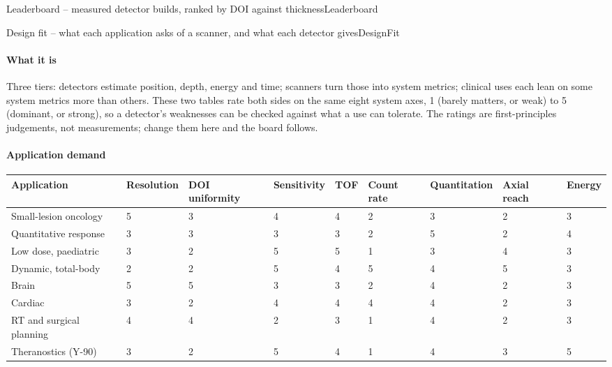 \begin{programnote}{Leaderboard -- measured detector builds, ranked by DOI against thickness}{Leaderboard}
\end{programnote}


\begin{programnote}{Design fit -- what each application asks of a scanner, and what each detector gives}{DesignFit}

\paragraph{What it is}
Three tiers: detectors estimate position, depth, energy and time; scanners
turn those into system metrics; clinical uses each lean on some system metrics
more than others. These two tables rate both sides on the same eight system
axes, 1 (barely matters, or weak) to 5 (dominant, or strong), so a detector's
weaknesses can be checked against what a use can tolerate. The ratings are
first-principles judgements, not measurements; change them here and the board
follows.

\paragraph{Application demand}

\begin{center}
\begin{scriptsize}
\setlength{\tabcolsep}{2.5pt}
\begin{tabular}{lllllllll}
\hline
Application & Resolution & DOI uniformity & Sensitivity & TOF & Count rate & Quantitation & Axial reach & Energy \\
\hline
Small-lesion oncology & 5 & 3 & 4 & 4 & 2 & 3 & 2 & 3 \\
Quantitative response & 3 & 3 & 3 & 3 & 2 & 5 & 2 & 4 \\
Low dose, paediatric & 3 & 2 & 5 & 5 & 1 & 3 & 4 & 3 \\
Dynamic, total-body & 2 & 2 & 5 & 4 & 5 & 4 & 5 & 3 \\
Brain & 5 & 5 & 3 & 3 & 2 & 4 & 2 & 3 \\
Cardiac & 3 & 2 & 4 & 4 & 4 & 4 & 2 & 3 \\
RT and surgical planning & 4 & 4 & 2 & 3 & 1 & 4 & 2 & 3 \\
Theranostics (Y-90) & 3 & 2 & 5 & 4 & 1 & 4 & 3 & 5 \\
\hline
\end{tabular}
\end{scriptsize}
\end{center}


\end{programnote}
